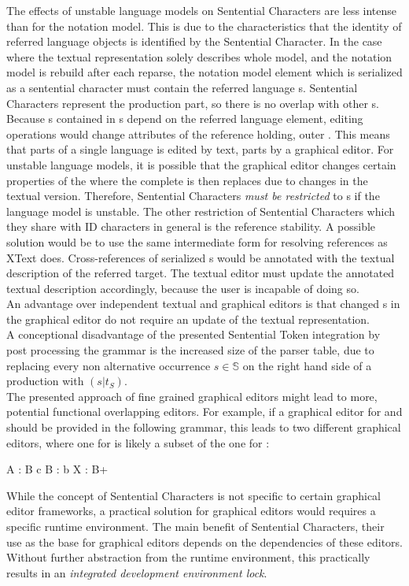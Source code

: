 The effects of unstable language models on Sentential Characters are less intense than for the notation model. This is due to the characteristics that the identity of referred language objects is identified by the Sentential Character. In the case where the textual representation solely describes whole model, and the notation model is rebuild after each reparse, the notation model element which is serialized as a sentential character must contain the referred language s. Sentential Characters represent the production part, so there is no overlap with other s. Because s contained in s depend on the referred language element, editing operations would change attributes  of the reference holding, outer . This means that parts of a single language  is edited by text, parts by a graphical editor. For unstable language models, it is possible that the graphical editor changes certain properties of the  where the complete  is then replaces due to changes in the textual version. Therefore, Sentential Characters \emph{must be restricted }to s if the language model is unstable. The other restriction of Sentential Characters which they share with ID characters in general is the reference stability. A possible solution would be to use the same intermediate form for resolving references as XText does. Cross-references of serialized s would be annotated with the textual description of the referred target. The textual editor must update the annotated textual description accordingly, because the user is incapable of doing so. \\
An advantage over independent textual and graphical editors is that changed s in the graphical editor do not require an update of the textual representation.\\
A conceptional disadvantage of the presented Sentential Token integration by post processing the grammar is the increased size of the parser table, due to replacing every non alternative occurrence $s \in \mathbb{S}$ on the right hand side of a production with $(s | t_S)$. \\
The presented approach of fine grained graphical editors might lead to more, potential functional overlapping editors. For example, if a graphical editor for  and  should be provided in the following grammar, this leads to two different graphical editors, where one for  is likely a subset of the one for :
\begin{xtxt}
A : B c
B : b
X : B+
\end{xtxt}
While the concept of Sentential Characters is not specific to certain graphical editor frameworks, a practical solution for graphical editors would requires a specific runtime environment. The main benefit of Sentential Characters, their use as the base for graphical editors depends on the dependencies of these editors. Without further abstraction from the runtime environment, this practically results in an \emph{integrated development environment lock}.

